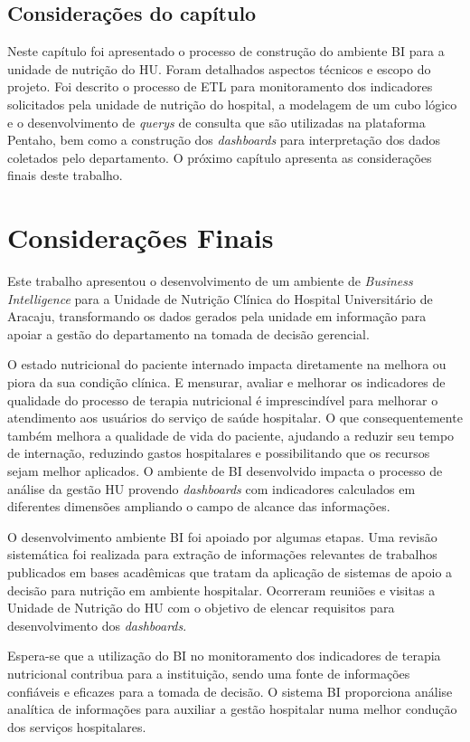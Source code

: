 \section{Considerações do capítulo}
Neste capítulo foi apresentado o processo de construção do ambiente BI para a unidade de nutrição do HU. Foram detalhados aspectos técnicos e escopo do projeto. Foi descrito o processo de ETL para monitoramento dos indicadores solicitados pela unidade de nutrição do hospital, a modelagem de um cubo lógico e o desenvolvimento de \textit{querys} de consulta que são utilizadas na plataforma Pentaho, bem como a construção dos \textit{dashboards} para interpretação dos dados coletados pelo departamento. O próximo capítulo apresenta as considerações finais deste trabalho.

\chapter{Considerações Finais}
Este trabalho apresentou o desenvolvimento de um ambiente de \textit{Business Intelligence} para a Unidade de Nutrição Clínica do Hospital Universitário de Aracaju, transformando os dados gerados pela unidade em informação para apoiar a gestão do departamento na tomada de decisão gerencial.

O estado nutricional do paciente internado impacta diretamente na melhora ou piora da sua condição clínica. E mensurar, avaliar e melhorar os indicadores de qualidade do processo de terapia nutricional é imprescindível para melhorar o atendimento aos usuários do serviço de saúde hospitalar. O que consequentemente também melhora a qualidade de vida do paciente, ajudando a reduzir seu tempo de internação, reduzindo gastos hospitalares e possibilitando que os recursos sejam melhor aplicados. O ambiente de BI desenvolvido impacta o processo de análise da gestão HU provendo \textit{dashboards} com indicadores calculados em diferentes dimensões ampliando o campo de alcance das informações.

O desenvolvimento ambiente BI foi apoiado por algumas etapas. Uma revisão sistemática foi realizada para extração de informações relevantes de trabalhos publicados em bases acadêmicas que tratam da aplicação de sistemas de apoio a decisão para nutrição em ambiente hospitalar. Ocorreram reuniões e visitas a Unidade de Nutrição do HU com o objetivo de elencar requisitos para desenvolvimento dos \textit{dashboards}. 

Espera-se que a utilização do BI no monitoramento dos indicadores de terapia nutricional contribua para a instituição, sendo uma fonte de informações confiáveis e eficazes para a tomada de decisão. O sistema BI proporciona análise analítica de informações para auxiliar a gestão hospitalar numa melhor condução dos serviços hospitalares.

